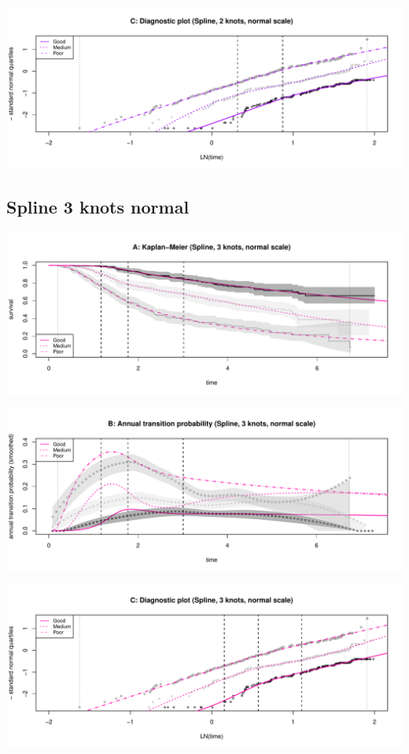 \documentclass[]{article}
\begin{document}
\begin{flushleft}\includegraphics[height=0.25\textheight]{Images/spline_norm2-3} \end{flushleft}

\newpage

\subsection{Spline 3 knots normal}\label{spline-3-knots-normal}

\begin{flushleft}\includegraphics[height=0.25\textheight]{Images/spline_norm3-1} \end{flushleft}

\begin{flushleft}\includegraphics[height=0.25\textheight]{Images/spline_norm3-2} \end{flushleft}

\begin{flushleft}\includegraphics[height=0.25\textheight]{Images/spline_norm3-3} \end{flushleft}
\end{document}
